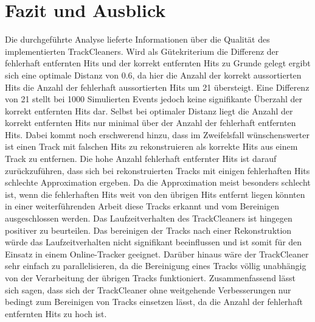 \chapter{Fazit und Ausblick}
Die durchgeführte Analyse lieferte Informationen über die Qualität des implementierten TrackCleaners. Wird als Gütekriterium die Differenz der fehlerhaft entfernten Hits und der korrekt entfernten Hits zu Grunde gelegt ergibt sich eine optimale Distanz von 0.6, da hier die Anzahl der korrekt aussortierten Hits die Anzahl der fehlerhaft aussortierten Hits um 21 übersteigt.
Eine Differenz von 21 stellt bei 1000 Simulierten Events jedoch keine signifikante Überzahl der korrekt entfernten Hits dar. Selbst bei optimaler Distanz liegt die Anzahl der korrekt entfernten Hits nur minimal über der Anzahl der fehlerhaft entfernten Hits. Dabei kommt noch erschwerend hinzu, dass im Zweifelsfall wünschenswerter ist einen Track mit falschen Hits zu rekonstruieren als korrekte Hits aus einem Track zu entfernen. Die hohe Anzahl fehlerhaft entfernter Hits ist darauf zurückzuführen, dass sich bei rekonstruierten Tracks mit einigen fehlerhaften Hits schlechte Approximation ergeben. Da die Approximation meist besonders schlecht ist, wenn die fehlerhaften Hits weit von den übrigen Hits entfernt liegen könnten in einer weiterführenden Arbeit diese Tracks erkannt und vom Bereinigen ausgeschlossen werden. Das Laufzeitverhalten des TrackCleaners ist hingegen positiver zu beurteilen. Das bereinigen der Tracks nach einer Rekonstruktion würde das Laufzeitverhalten nicht signifikant beeinflussen und ist somit für den Einsatz in einem Online-Tracker geeignet. Darüber hinaus wäre der TrackCleaner sehr einfach zu parallelisieren, da die Bereinigung eines Tracks völlig unabhängig von der Verarbeitung der übrigen Tracks funktioniert. Zusammenfassend lässt sich sagen, dass sich der TrackCleaner  ohne weitgehende Verbesserungen nur bedingt zum Bereinigen von Tracks einsetzen lässt, da die Anzahl der fehlerhaft entfernten Hits zu hoch ist.